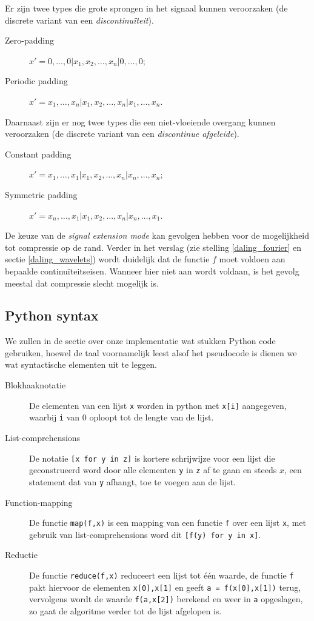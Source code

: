 Er zijn twee types die grote sprongen in het signaal kunnen veroorzaken (de discrete variant van een \emph{discontinu\"iteit}).
\begin{description}
\item[Zero-padding] $x' = 0, \ldots, 0| x_1, x_2, \ldots, x_n| 0, \ldots, 0$;
\item[Periodic padding] $x' = x_1, \ldots, x_n| x_1, x_2, \ldots, x_n| x_1, \ldots, x_n$.
\end{description}
Daarnaast zijn er nog twee types die een niet-vloeiende overgang kunnen veroorzaken (de discrete variant van een \emph{discontinue afgeleide}).
\begin{description}
\item[Constant padding] $x' = x_1, \ldots, x_1| x_1, x_2, \ldots, x_n| x_n, \ldots, x_n$;
\item[Symmetric padding] $x' = x_n, \ldots, x_1| x_1, x_2, \ldots, x_n| x_n, \ldots, x_1$.
\end{description}

De keuze van de \emph{signal extension mode} kan gevolgen hebben voor de mogelijkheid tot compressie op de rand. Verder in het verslag (zie stelling \ref{daling_fourier} en sectie \ref{daling_wavelets}) wordt duidelijk dat de functie $f$ moet voldoen aan bepaalde continu\"iteitseisen. Wanneer hier niet aan wordt voldaan, is het gevolg meestal dat compressie slecht mogelijk is.

\subsection{Python syntax}
We zullen in de sectie over onze implementatie wat stukken Python code gebruiken, hoewel de taal
voornamelijk leest alsof het pseudocode is dienen we wat syntactische elementen uit te leggen.
\begin{description}
\item[Blokhaaknotatie] De elementen van een lijst \texttt{x} worden in python met \texttt{x[i]} aangegeven,
  waarbij \texttt{i} van $0$ oploopt tot de lengte van de lijst.
\item[List-comprehensions] De notatie \texttt{[x for y in z]} is kortere schrijwijze voor een lijst die geconstrueerd
  word door alle elementen \texttt{y} in \texttt{z} af te gaan en steeds 
  $x$, een statement dat van \texttt{y} afhangt, toe te voegen aan de lijst.
\item[Function-mapping] De functie \texttt{map(f,x)} is een mapping van een functie \texttt{f} over een lijst 
  \texttt{x}, met gebruik van list-comprehensions word dit \texttt{[f(y) for y in x]}.
\item[Reductie] De functie \texttt{reduce(f,x)} reduceert een lijst tot \'e\'en waarde, de functie \texttt{f} pakt
  hiervoor de elementen \texttt{x[0],x[1]} en geeft \texttt{a = f(x[0],x[1])} terug, vervolgens wordt
  de waarde \texttt{f(a,x[2])} berekend en weer in \texttt{a} opgeslagen, zo gaat de algoritme verder tot de lijst
  afgelopen is.
\end{description}
